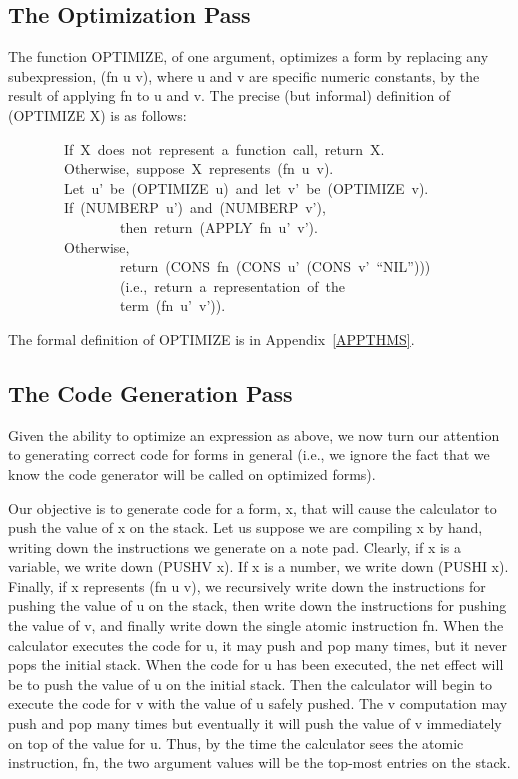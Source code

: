 \documentclass[10pt]{book}
\newenvironment{pubasis}{\begin{flushleft}}{\end{flushleft}}
\begin{document}
\subsection{The Optimization Pass}
The function OPTIMIZE, of one argument, optimizes a form
by replacing any subexpression, (fn u v), where u and
v are specific numeric constants, by the result of
applying fn to u and v.  The precise  (but informal) definition of
(OPTIMIZE X) is as follows:

\begin{pubasis}
~~~~~~~~If~X~does~not~represent~a~function~call,~return~X.\\

~~~~~~~~Otherwise,~suppose~X~represents~(fn~u~v).\\
~~~~~~~~Let~u'~be~(OPTIMIZE~u)~and~let~v'~be~(OPTIMIZE~v).\\
~~~~~~~~If~(NUMBERP~u')~and~(NUMBERP~v'),\\
~~~~~~~~~~~~~~~~then~return~(APPLY~fn~u'~v').\\
~~~~~~~~Otherwise,\\
~~~~~~~~~~~~~~~~return~(CONS~fn~(CONS~u'~(CONS~v'~``NIL'')))\\
~~~~~~~~~~~~~~~~(i.e.,~return~a~representation~of~the\\
~~~~~~~~~~~~~~~~term~(fn~u'~v')).\\
\end{pubasis}
The formal definition of OPTIMIZE is in Appendix~\ref{APPTHMS}.

\subsection{The Code Generation Pass}
Given the ability to optimize an expression as above, we 
now turn our attention to generating correct code for
forms in general (i.e., we  ignore the fact that we
know the code generator will be called on optimized forms).

Our objective is to generate code for a form, x, that will cause
the calculator to push the value of x on the stack.
Let us suppose we are compiling x by hand, writing down
the instructions we generate on a note pad.
Clearly, if x is a variable, we    write down (PUSHV x).
If x is a number, we write down (PUSHI x).  Finally,
if x represents (fn u v), we recursively write down the
instructions for pushing the value of u on the stack, then write down
the instructions for pushing the value of v, and finally write down
the single atomic instruction fn.
When the calculator executes the code for u, it may push and
pop many times,
but it never pops the initial stack.
When the code for u has been executed, the net effect will be to push
the value of u on  the initial stack.  Then the calculator will
begin to execute the code for v with the value of u safely pushed.
The v computation
may push and pop many times but eventually it will push the
value of v immediately on top of the value for u.
Thus, by the time the calculator sees the atomic instruction, fn,
the two argument values will be the top-most entries on the stack.
\end{document}
